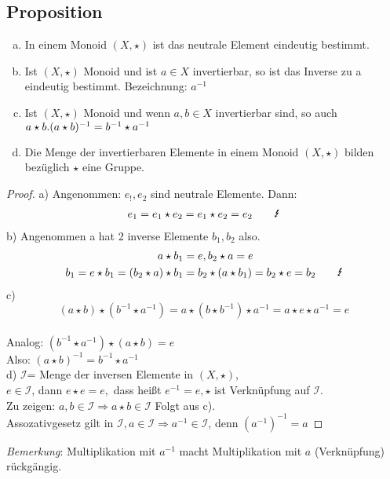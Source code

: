 \subsection{Proposition}\label{sec:1.5}
\begin{enumerate}[a)]
\item In einem Monoid $(X,\star)$ ist das neutrale Element eindeutig bestimmt.
\item Ist $(X,\star)$ Monoid und ist $a \in X$ invertierbar, so ist das Inverse zu a eindeutig bestimmt. Bezeichnung: $a^{-1}$
\item Ist $(X, \star)$ Monoid und wenn $a,b \in X$ invertierbar sind, so auch $a \star b.\\
(a \star b)^{-1} = b^{-1} \star a^{-1}$
\item Die Menge der invertierbaren Elemente in einem Monoid $(X, \star)$ bilden bezüglich $\star$ eine Gruppe.
\end{enumerate}
\begin{proof}
a) Angenommen: $e_!,e_2$ sind neutrale Elemente. Dann:
\begin{align}
e_1 = e_1 \star e_2 = e_1 \star e_2 = e_2 \qquad{\text{\Lightning}}\notag
\end{align}
b) Angenommen a hat 2 inverse Elemente $b_1, b_2$ also.\\
\begin{align}
a \star b_1 &= e, b_2 \star a = e \notag\\
b_1 = e \star b_1 = (b_2 \star a) \star b_1 &= b_2 \star (a \star b_1) = b_2 \star e = b_2 \qquad \text{\Lightning} \notag
\end{align}
c) $$(a \star b)\star (b^{-1} \star a^{-1}) = a \star (b \star b^{-1}) \star a^{-1} = a \star e \star a^{-1} = e$$\\
Analog: $(b^{-1} \star a^{-1})\star (a \star b) =e $\\
Also: $(a \star b)^{-1} = b^{-1} \star a^{-1}$\\
d) $\mathcal{I}$= Menge der inversen Elemente in $(X, \star)$,\\ $e \in \mathcal{I}$, dann $e \star e = e,$ dass hei\ss t $e^{-1} = e, \star$ ist Verknüpfung auf $\mathcal{I}$.\\
Zu zeigen: $a,b \in \mathcal{I} \Rightarrow a \star b \in \mathcal{I}$ Folgt aus c).\\
Assozativgesetz gilt in $\mathcal{I}, a \in \mathcal{I} \Rightarrow a^{-1} \in \mathcal{I}$, denn $(a^{-1})^{-1} = a$
\end{proof}
\emph{Bemerkung}: Multiplikation mit $a^{-1}$ macht Multiplikation mit $a$ (Verknüpfung) rückgängig.
